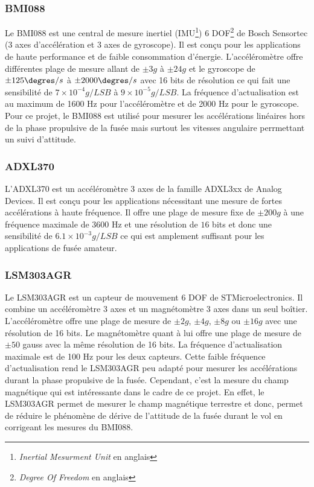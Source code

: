 \documentclass{article}
\begin{document}
\subsubsection{BMI088}

Le BMI088 est une central de mesure inertiel (IMU\footnote{\textit{Inertial Mesurment
 Unit} en anglais}) 6 DOF\footnote{\textit{Degree Of Freedom} en anglais} de Bosch
Sensortec (3 axes d'accélération et 3 axes de gyroscope). Il est conçu pour les
applications de haute performance et de faible consommation d'énergie. L'accéléromètre
offre différentes plage de mesure allant de $\pm 3g$ à $\pm 24g$ et le gyroscope de $\pm
125\degres/s$ à $\pm 2000\degres/s$ avec 16 bits de résolution ce qui fait une sensibilité de
$7\times10^{-4} g/LSB$ à $9\times10^{-5} g/LSB$. La fréquence d'actualisation
est au maximum de 1600 Hz pour l'accéléromètre et de 2000 Hz pour le gyroscope.\\

Pour ce projet, le BMI088 est utilisé pour mesurer les accélérations linéaires hors de la phase
propulsive de la fusée mais surtout les vitesses angulaire perrmettant un suivi d'attitude.

\subsubsection{ADXL370}

L'ADXL370 est un accéléromètre 3 axes de la famille ADXL3xx de Analog Devices. Il est
conçu pour les applications nécessitant une mesure de fortes accélérations à haute fréquence.
Il offre une plage de mesure fixe de $\pm 200g$ à une fréquence maximale de 3600 Hz et une
résolution de $16$ bits et donc une sensibilité de $6.1\times10^{-3} g/LSB$ ce qui est amplement
suffisant pour les applications de fusée amateur.

\subsubsection{LSM303AGR}

Le LSM303AGR est un capteur de mouvement 6 DOF de STMicroelectronics. Il combine un
accéléromètre 3 axes et un magnétomètre 3 axes dans un seul boîtier. L'accéléromètre
offre une plage de mesure de $\pm 2g$, $\pm 4g$, $\pm 8g$ ou $\pm 16g$ avec une résolution de 16
bits. Le magnétomètre quant à lui offre une plage de mesure de $\pm 50$ gauss avec la même
résolution de 16 bits. La fréquence d'actualisation maximale est de 100 Hz pour les deux
capteurs. Cette faible fréquence d'actualisation rend le LSM303AGR peu adapté pour mesurer les
accélérations durant la phase propulsive de la fusée. Cependant, c'est la mesure du champ
magnétique qui est intéressante dans le cadre de ce projet. En effet, le LSM303AGR permet
de mesurer le champ magnétique terrestre et donc, permet de réduire le phénomène de
dérive de l'attitude de la fusée durant le vol en corrigeant les mesures du BMI088.\\
\end{document}
